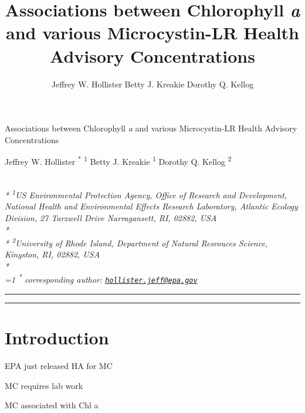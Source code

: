 \documentclass[11pt,]{article}
\title{Associations between Chlorophyll \emph{a} and various Microcystin-LR
Health Advisory Concentrations}
\author{
Jeffrey W. Hollister
Betty J. Kreakie
Dorothy Q. Kellog
}
\date{}
\begin{document}
\begin{singlespace}
\begin{center}
\huge Associations between Chlorophyll \emph{a} and various Microcystin-LR
Health Advisory Concentrations
\end{center}
\begin{center}
\large
Jeffrey W. Hollister \textsuperscript{*} \textsuperscript{1} 
Betty J. Kreakie \textsuperscript{1} 
Dorothy Q. Kellog \textsuperscript{2} 
\end{center}
\begin{justify}
\footnotesize \emph{ 
\\*
\textsuperscript{1}US Environmental Protection Agency, Office of Research and Development,
National Health and Environmental Effects Research Laboratory, Atlantic
Ecology Division, 27 Tarzwell Drive Narragansett, RI, 02882, USA\\*
\\*
\textsuperscript{2}University of Rhode Island, Department of Natural Resrouces Science,
Kingston, RI, 02882, USA\\*
}
\setcounter{num}{1}
\\[0.1cm]
\footnotesize \emph{ 
\ifnum\value{num}=1%
\textsuperscript{*} corresponding author:
\fi
\href{mailto:hollister.jeff@epa.gov}{\nolinkurl{hollister.jeff@epa.gov}}
}
\end{justify}
\normalsize

\end{singlespace}


\singlespace

\vspace{2mm}

\hrule

\vspace{3mm}

\hrule

\doublespace

\section{Introduction}\label{introduction}

EPA just released HA for MC

MC requires lab work

MC associated with Chl a
\end{document}
